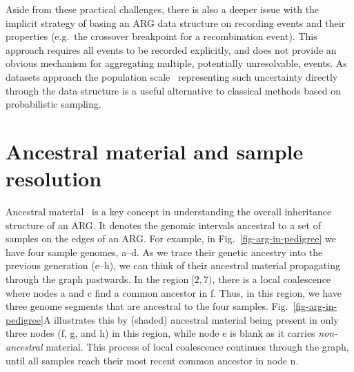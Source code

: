 \documentclass[9pt,twocolumn,twoside]{gsajnl}
\newcommand{\noderef}[1]{\textsf{#1}}
\begin{document}
Aside from these practical challenges, there is also a deeper
issue with the implicit strategy of basing an ARG data structure on
recording events and their properties (e.g.\ the crossover breakpoint
for a recombination event). 
This approach 
requires all events to be recorded explicitly, and does not 
provide an obvious mechanism for aggregating multiple, potentially
unresolvable, events.
As datasets approach the population scale~\citep[e.g.][]{
turnbull2018hundred, bycroft2018genome,hayes20191000,
Ros-Freixedes2020,karczewski2020mutational,tanjo2021practical,
halldorsson2022sequences} representing such uncertainty 
directly through the data structure is a useful alternative to 
classical methods based on probabilistic sampling.


\section{Ancestral material and sample resolution}
\label{sec-ancestral-material}
Ancestral material~\citep{wiuf1999ancestry,wiuf1999recombination}
is a key concept in understanding the overall inheritance structure
of an ARG.
It denotes the genomic intervals ancestral to a set of samples
on the edges of an ARG.
For example, in Fig.~\ref{fig-arg-in-pedigree} we have
four sample genomes, \noderef{a}--\noderef{d}. As we
trace their genetic ancestry into the previous generation
(\noderef{e}--\noderef{h}), we can think of their ancestral
material propagating through the graph
pastwards. In the region $[2, 7)$, there is a
local coalescence where nodes \noderef{a} and \noderef{c}
find a common ancestor in \noderef{f}. Thus, in this region,
we have three genome segments that are ancestral to the
four samples. Fig.~\ref{fig-arg-in-pedigree}A
illustrates this by (shaded) ancestral material being present
in only three nodes (\noderef{f}, \noderef{g}, and \noderef{h}) in this region,
while node \noderef{e} is blank
as it carries \emph{non-ancestral} material.
This process of local coalescence continues through the
graph, until all samples reach their most recent common
ancestor in node \noderef{n}.
\end{document}
